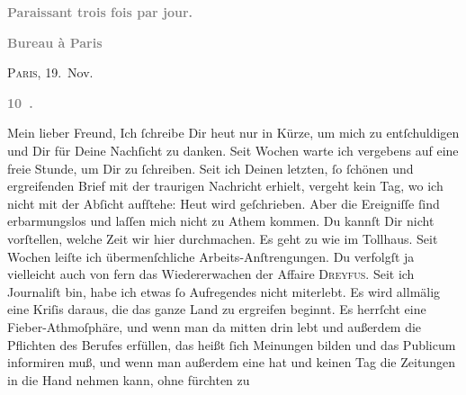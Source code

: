 \begin{ledgroupsized}[t]{13cm}
           \pstart
           \begin{otherlanguage}{french}\textcolor{gray}{\textbf{\textbf{Paraissant trois fois par jour.}}}\end{otherlanguage}\pend
           \pstart
           \begin{otherlanguage}{french}\textcolor{gray}{\textbf{\textbf{Bureau à Paris}}}\end{otherlanguage}\hfill \textsc{Paris}, 19. Nov.\pend
           \pstart
           \begin{otherlanguage}{french}\textcolor{gray}{\textbf{\textbf{10 .}}}\end{otherlanguage}\pend
           \pstart\center{}Mein lieber Freund,\pend\pstart
           Ich ſchreibe Dir heut nur in Kürze, um mich zu
                  entſchuldigen\strikeout{\textcolor{gray}{.}} und Dir für Deine Nachſicht zu danken. Seit Wochen warte ich vergebens auf
               eine freie Stunde, um \strikeout{\textcolor{gray}{×}\-\textcolor{gray}{×}\-\textcolor{gray}{×}} Dir zu  ſchreiben. Seit ich Deinen letzten, ſo ſchönen und ergreifenden Brief mit der
               traurigen Nachricht erhielt, vergeht kein Tag, wo ich nicht mit der Abſicht aufſtehe:
               Heut wird geſchrieben. Aber die Ereigniſſe ſind erbarmungslos und laſſen mich nicht
               zu Athem kommen.  Du kannſt Dir nicht vorſtellen,
               welche Zeit wir {\pb}hier durchmachen. Es geht zu wie im
               Tollhaus. Seit Wochen leiſte ich übermenſchliche Arbeits-Anſtrengungen. Du verfolgſt
               ja vielleicht auch von fern das Wiedererwachen der Affaire \textsc{Dreyfus}. Seit ich Journaliſt bin, habe ich etwas ſo Aufregendes nicht miterlebt. Es
               wird allmälig eine Kriſis daraus, die das ganze Land zu ergreifen beginnt. Es herrſcht eine Fieber-Athmoſphäre,
               und wenn man da mitten drin lebt und außerdem die Pflichten des Berufes erfüllen, das
               heißt ſich Meinungen bilden und das Publicum informiren muß, und wenn man außerdem
               eine \label{K_L02831-2v}\label{K_L02831-2h} hat und keinen Tag die Zeitungen in die Hand nehmen kann, ohne fürchten zu

\end{ledgroupsized}
